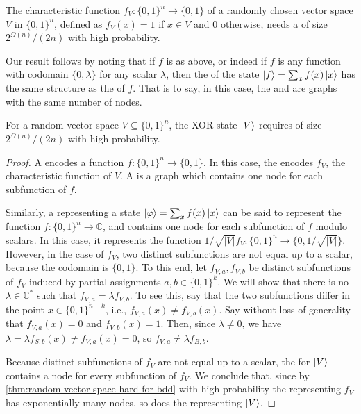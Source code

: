\begin{theorem}
	\label{thm:random-vector-space-hard-for-bdd}
	The characteristic function $f_V: \{0, 1\}^n \rightarrow \{0, 1\}$ of a randomly chosen vector space $V$ in $\{0, 1\}^n$, defined as $f_V(x)=1$ if $x\in V$ and  $0$ otherwise, needs a \bdd of size $2^{\Omega(n)}/(2n)$ with high probability.
\end{theorem}

Our result follows by noting that if $f$ is as above, or indeed if $f$ is any function with codomain $\{0, \lambda\}$ for any scalar $\lambda$, then the \qmdd of the state $\ket{f}=\sum_xf(x)\ket{x}$ has the same structure as the \bdd of $f$.
That is to say, in this case, the \bdd and \qmdd are graphs with the same number of nodes.

\begin{corollary}
	\label{thm:random-xor-state-hard-for-qmdd}
	For a random vector space $V\subseteq \{0,1\}^n$, the XOR-state $\ket{V}$ requires \qmdds of size $2^{\Omega(n)}/(2n)$ with high probability.
\end{corollary}
\begin{proof}
	A \bdd encodes a function $f\colon \{0,1\}^n\to\{0,1\}$.
	In this case, the \bdd encodes $f_V$, the characteristic function of $V$.
	A \bdd is a graph which contains one node for each subfunction of $f$.
	
	Similarly, a \qmdd representing a state $\ket{\varphi}=\sum_xf(x)\ket{x}$ can be said to represent the function $f\colon\{0,1\}^n\to\mathbb C$, and contains one node for each subfunction of $f$ modulo scalars.
	In this case, it represents the function $1/\sqrt{|V|}f_V\colon \{0,1\}^n\to\{0,1/\sqrt{|V|}\}$.
	However, in the case of $f_V$, two distinct subfunctions are not equal up to a scalar, because the codomain is $\{0,1\}$.
	To this end, let $f_{V,a},f_{V,b}$ be distinct subfunctions of $f_V$ induced by partial assignments $a,b\in\{0,1\}^k$.
	We will show that there is no $\lambda\in\mathbb C^{\ast}$ such that $f_{V,a}=\lambda f_{V,b}$.
	To see this, say that the two subfunctions differ in the point $x\in\{0,1\}^{n-k}$, i.e., $f_{V,a}(x)\ne f_{V,b}(x)$.
	Say without loss of generality that $f_{V,a}(x)=0$ and $f_{V,b}(x)=1$.
	Then, since $\lambda\ne 0$, we have $\lambda=\lambda f_{S,b}(x)\ne f_{V,a}(x)=0$, so $f_{V,a}\ne \lambda f_{B,b}$.
	
	Because distinct subfunctions of $f_V$ are not equal up to a scalar, the \qmdd for $\ket{V}$ contains a node for every subfunction of $f_V$.
	We conclude that, since by \autoref{thm:random-vector-space-hard-for-bdd} with high probability the \bdd representing $f_V$ has exponentially many nodes, so does the \qmdd representing $\ket{V}$.
\end{proof}